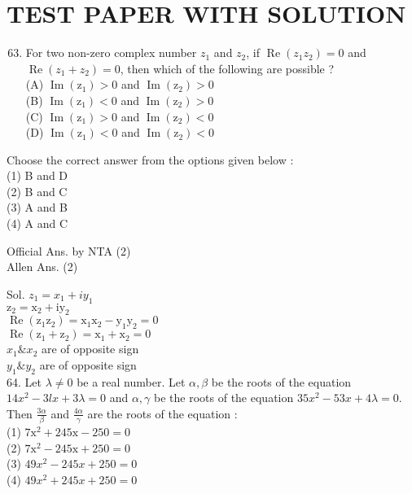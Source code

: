 \documentclass[10pt]{article}
\begin{document}
\section*{TEST PAPER WITH SOLUTION}
\begin{enumerate}
  \setcounter{enumi}{62}
  \item For two non-zero complex number \(z_{1}\) and \(z_{2}\), if \(\operatorname{Re}\left(z_{1} z_{2}\right)=0\) and \(\operatorname{Re}\left(z_{1}+z_{2}\right)=0\), then which of the following are possible ?\\
(A) \(\operatorname{Im}\left(\mathrm{z}_{1}\right)>0\) and \(\operatorname{Im}\left(\mathrm{z}_{2}\right)>0\)\\
(B) \(\operatorname{Im}\left(\mathrm{z}_{1}\right)<0\) and \(\operatorname{Im}\left(\mathrm{z}_{2}\right)>0\)\\
(C) \(\operatorname{Im}\left(\mathrm{z}_{1}\right)>0\) and \(\operatorname{Im}\left(\mathrm{z}_{2}\right)<0\)\\
(D) \(\operatorname{Im}\left(\mathrm{z}_{1}\right)<0\) and \(\operatorname{Im}\left(\mathrm{z}_{2}\right)<0\)
\end{enumerate}

Choose the correct answer from the options given below :\\
(1) B and D\\
(2) B and C\\
(3) A and B\\
(4) A and C

Official Ans. by NTA (2)\\
Allen Ans. (2)

Sol. \(z_{1}=x_{1}+i y_{1}\)\\
\(\mathrm{z}_{2}=\mathrm{x}_{2}+\mathrm{iy}_{2}\)\\
\(\operatorname{Re}\left(\mathrm{z}_{1} \mathrm{z}_{2}\right)=\mathrm{x}_{1} \mathrm{x}_{2}-\mathrm{y}_{1} \mathrm{y}_{2}=0\)\\
\(\operatorname{Re}\left(\mathrm{z}_{1}+\mathrm{z}_{2}\right)=\mathrm{x}_{1}+\mathrm{x}_{2}=0\)\\
\(x_{1} \& x_{2}\) are of opposite sign\\
\(y_{1} \& y_{2}\) are of opposite sign\\
64. Let \(\lambda \neq 0\) be a real number. Let \(\alpha, \beta\) be the roots of the equation \(14 x^{2}-3 l x+3 \lambda=0\) and \(\alpha, \gamma\) be the roots of the equation \(35 x^{2}-53 x+4 \lambda=0\). Then \(\frac{3 \alpha}{\beta}\) and \(\frac{4 \alpha}{\gamma}\) are the roots of the equation :\\
(1) \(7 \mathrm{x}^{2}+245 \mathrm{x}-250=0\)\\
(2) \(7 \mathrm{x}^{2}-245 \mathrm{x}+250=0\)\\
(3) \(49 x^{2}-245 x+250=0\)\\
(4) \(49 x^{2}+245 x+250=0\)
\end{document}
